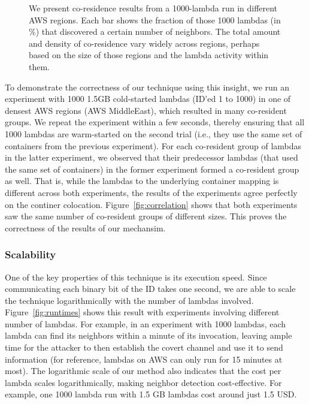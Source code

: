 \begin{figure}[!t]
\begin{subfigure}{.33\textwidth}
  \end{subfigure}
  \caption{We present co-residence results from a 1000-lambda run in different AWS regions. Each bar shows the fraction 
  of those 1000 lambdas (in \%) that discovered a certain number of neighbors. The total amount and density of co-residence 
  vary widely across regions, perhaps based on the size of those regions and the lambda activity within them. }
  \label{fig:awsregions}
  \end{figure}

To demonstrate the correctness of our technique using this insight, we run an
experiment with 1000 1.5GB cold-started lambdas (ID'ed 1 to 1000) in one of
densest AWS regions (AWS MiddleEast), which resulted in many co-resident groups.
We repeat the experiment within a few seconds, thereby ensuring that all 1000
lambdas are warm-started on the second trial (i.e., they use the same set of
containers from the previous experiment).  For each co-resident group of lambdas
in the latter experiment, we observed that their predecessor lambdas (that used
the same set of containers) in the former experiment formed a co-resident group
as well.  That is, while the lambdas to the underlying container mapping is
different across both experiments, the results of the experiments agree
perfectly on the continer colocation. Figure~\ref{fig:correlation} shows that
both experiments saw the same number of co-resident groups of different sizes.
This proves the correctness of the results of our mechansim.

\subsubsection{Scalability}
One of the key properties of this technique is its execution speed. Since
communicating each binary bit of the ID takes one second, we are able to scale
the technique logarithmically with the number of lambdas involved.
Figure~\ref{fig:runtimes} shows this result with experiments involving
different number of lambdas. For example, in an experiment with 1000 lambdas,
each lambda can find its neighbors within a minute of its invocation, leaving
ample time for the attacker to then establish the covert channel and use it to 
send information (for reference, lambdas on AWS can only run for 15 minutes at most). 
The logarithmic scale of our method also indicates that the 
cost per lambda scales logarithmically, making neighbor detection cost-effective.
For example, one 1000 lambda run with 1.5 GB lambdas cost around just 1.5 USD. 



